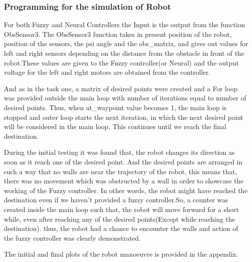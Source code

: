 \documentclass{l4proj}
\begin{document}
\subsubsection{Programming for the simulation of Robot}

For both Fuzzy and Neural Controllers the Input is the output from the function ObsSensor3. The ObsSensor3 function takes in present position of the robot, position of the sensors, the psi angle and the obs\_matrix, and gives out values for left and right sensors depending on the distance from the obstacle in front of the robot.These values are given to the Fuzzy controller(or Neural) and the output voltage for the left and right motors are obtained from the controller.

 And as in the task one, a matrix of desired points were created and a For loop was provided outside the main loop with number of iterations equal to number of desired points. Thus, when at\_waypoint value becomes 1, the main loop is stopped and outer loop starts the next iteration, in which the next desired point will be considered in the main loop. This continues until we reach the final destination.

During the initial testing it was found that, the robot changes its direction as soon as it reach one of the desired point. And the desired points are arranged in such a way that no walls are near the trajectory of the robot. this means that, there was no movement which was obstructed by a wall in order to showcase the working of the Fuzzy controller. In other words, the robot might have reached the destination even if we haven't provided a fuzzy controller.So, a counter was created inside the main loop such that, the robot will move forward for a short while, even after reaching any of the  desired points(Except while reaching the destination). thus, the robot had a chance to encounter the walls and action of the fuzzy controller was clearly demonstrated.

The initial and final plots of the robot manoeuvre is provided in the appendix. 
\end{document}
